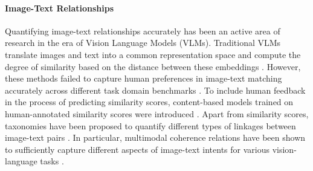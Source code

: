 \paragraph{Image-Text Relationships}
Quantifying image-text relationships accurately has been an active area of research in the era of Vision Language Models (VLMs). Traditional VLMs translate images and text into a common representation space and compute the degree of similarity based on the distance between these embeddings \cite{Radford2021-ro, Jia2021-lq, Caron2021-cq, Hessel2021-we}. However, these methods failed to capture human preferences in image-text matching accurately across different task domain benchmarks \cite{Anantha-Ramakrishnan2024-sv, Ross2024-np, Anantha-Ramakrishnan2024-rm}. To include human feedback in the process of predicting similarity scores, content-based models trained on human-annotated similarity scores were introduced \cite{Wu2023-qy, Kirstain2023-km, Xu2023-rj}. Apart from similarity scores, taxonomies have been proposed to quantify different types of linkages between image-text pairs \cite{Marsh2003-hz, Vempala2019-lh, Kruk2019-ac, Bateman2014-dx}. In particular, multimodal coherence relations have been shown to sufficiently capture different aspects of image-text intents for various vision-language tasks \cite{Alikhani2019-kn, Inan2021-ip, Alikhani2023-nm, Alikhani2020-nr, Xu2022-ie}.

